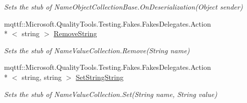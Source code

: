 \begin{DoxyCompactItemize}
\begin{DoxyCompactList}\small\item\em Sets the stub of Name\-Object\-Collection\-Base.\-On\-Deserialization(\-Object sender)\end{DoxyCompactList}\item 
mqttf\-::\-Microsoft.\-Quality\-Tools.\-Testing.\-Fakes.\-Fakes\-Delegates.\-Action\\*
$<$ string $>$ \hyperlink{class_system_1_1_collections_1_1_specialized_1_1_fakes_1_1_stub_name_value_collection_a71b645de330903616787074729c156ee}{Remove\-String}
\begin{DoxyCompactList}\small\item\em Sets the stub of Name\-Value\-Collection.\-Remove(\-String name)\end{DoxyCompactList}\item 
mqttf\-::\-Microsoft.\-Quality\-Tools.\-Testing.\-Fakes.\-Fakes\-Delegates.\-Action\\*
$<$ string, string $>$ \hyperlink{class_system_1_1_collections_1_1_specialized_1_1_fakes_1_1_stub_name_value_collection_a05c7ff4cb3723fc9815cd843988faa9a}{Set\-String\-String}
\begin{DoxyCompactList}\small\item\em Sets the stub of Name\-Value\-Collection.\-Set(\-String name, String value)\end{DoxyCompactList}\end{DoxyCompactItemize}
